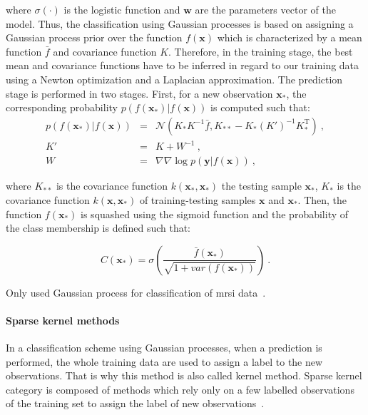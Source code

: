 \noindent where $\sigma(\cdot)$ is the logistic function and $\mathbf{w}$ are the parameters vector of the model.
Thus, the classification using Gaussian processes is based on assigning a Gaussian process prior over the function $f(\mathbf{x})$ which is characterized by a mean function $\bar{f}$ and covariance function $K$.
Therefore, in the training stage, the best mean and covariance functions have to be inferred in regard to our training data using a Newton optimization and a Laplacian approximation.
The prediction stage is performed in two stages.
First, for a new observation $\mathbf{x}_*$, the corresponding probability $p(f(\mathbf{x}_*)|f(\mathbf{x}))$ is computed such that:
\begin{eqnarray}
	p(f(\mathbf{x}_*)|f(\mathbf{x})) & = & \mathcal{N}( K_*K^{-1}\bar{f}, K_{**}-K_*(K')^{-1}K_*^{\text{T}} ) \ , \nonumber \\
	K' & = & K + W^{-1} \ , \label{eq:gp2} \\
	W & = & \nabla \nabla \log p(\mathbf{y}|f(\mathbf{x})) \ , \nonumber
\end{eqnarray}

\noindent where $K_{**}$ is the covariance function $k(\mathbf{x}_*, \mathbf{x}_*)$ the testing sample $\mathbf{x}_*$, $K_{*}$ is the covariance function $k(\mathbf{x}, \mathbf{x}_*)$ of training-testing samples $\mathbf{x}$ and $\mathbf{x}_*$.
Then, the function $f(\mathbf{x}_*)$ is squashed using the sigmoid function and the probability of the class membership is defined such that:

\begin{equation}
	C(\mathbf{x}_*) = \sigma\left( \frac{\bar{f}(\mathbf{x_*})}{\sqrt{1+var(f(\mathbf{x}_*))}} \right) \ .
	\label{eq:gp3}
\end{equation}

Only \citeauthor{Kelm2007} used Gaussian process for classification of \ac{mrsi} data~\cite{Kelm2007}.

\paragraph{Sparse kernel methods}
In a classification scheme using Gaussian processes, when a prediction is performed, the whole training data are used to assign a label to the new observations.
That is why this method is also called kernel method.
Sparse kernel category is composed of methods which rely only on a few labelled observations of the training set to assign the label of new observations~\cite{Bishop2006}.

